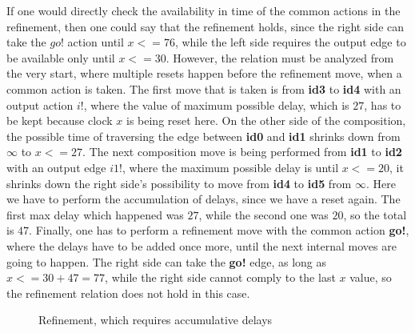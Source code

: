 If one would directly check the availability in time of the common actions in the refinement, then one could say that the refinement holds, since the right side can take the $go!$ action until $x<=76$, while the left side requires the output edge to be available only until $x<=30$. However, the relation must be analyzed from the very start, where multiple resets happen before the refinement move, when a common action is taken. The first move that is taken is from \textbf{id3} to \textbf{id4} with an output action $i!$, where the value of maximum possible delay, which is $27$, has to be kept because clock $x$ is being reset here. On the other side of the composition, the possible time of traversing the edge between \textbf{id0} and \textbf{id1} shrinks down from $\infty$ to $x<=27$. The next composition move is being performed from \textbf{id1} to \textbf{id2} with an output edge $i1!$, where the maximum possible delay is until $x<=20$, it shrinks down the right side's possibility to move from \textbf{id4} to \textbf{id5} from $\infty$. Here we have to perform the accumulation of delays, since we have a reset again. The first max delay which happened was $27$, while the second one was $20$, so the total is $47$. Finally, one has to perform a refinement move with the common action \textbf{go!}, where the delays have to be added once more, until the next internal moves are going to happen. The right side can take the \textbf{go!} edge, as long as $x<=30+47=77$, while the right side cannot comply to the last $x$ value, so the refinement relation does not hold in this case.

\begin{figure}
\centering
{}
\caption{Refinement, which requires accumulative delays} \label{fig:accDelay}
\end{figure}

